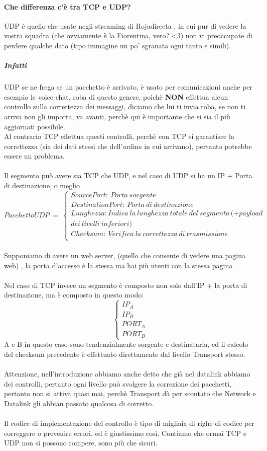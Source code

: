 \documentclass[12pt, a4paper, openany, twoside]{book}
\begin{document}
\paragraph{Che differenza c'è tra TCP e UDP?}
UDP è quello che usate negli streaming di Rojadirecta
, in cui pur di vedere la vostra squadra 
(che ovviamente è la Fiorentina, vero? <3) non vi preoccupate di perdere qualche
dato (tipo immagine un po' sgranata ogni tanto e simili).
\subparagraph{Infatti} UDP se ne frega se un pacchetto è arrivato, è usato
per comunicazioni anche per esempio le voice chat, roba di questo genere, poichè
\textbf{NON} effettua alcun controllo sulla correttezza dei messaggi, diciamo
che lui ti invia roba, se non ti arriva non gli importa, va avanti, perchè qui
è importante che si sia il più aggiornati possibile.
\\ 
Al contrario TCP effettua questi controlli, perchè con TCP si garantisce la 
correttezza (sia dei dati stessi che dell'ordine in cui arrivano), pertanto 
potrebbe essere un problema.
\\ \\
Il segmento può avere sia TCP che UDP, e nel caso di UDP si ha un IP +
Porta di destinazione, o meglio
$$Pacchetto UDP~ =~ \begin{cases}
SourcePort: ~Porta~ sorgente \\
DestinationPort: ~Porta~ di ~destinazione \\
Lunghezza: Indica~ la~ lunghezza ~totale ~del ~segmento~ (+payload~ \\dei ~livelli
~inferiori)\\
Checksum:~ Verifica ~la ~correttezza ~di ~trasmissione \\
\end{cases}$$
\\ 
Supponiamo di avere un web server, (quello che consente di vedere una pagina web)
, la porta d'accesso è la stessa ma hai più utenti con la stessa pagina
\\ \\
Nel caso di TCP invece un segmento è composto non solo dall'IP + la porta di 
destinazione, ma è composto in questo modo:
$$\begin{cases}
IP_{A} \\
IP_{B} \\
PORT_{A} \\
PORT_{B}
\end{cases}$$
A e B in questo caso sono tendenzialmente sorgente e destinataria, ed il calcolo
del checksum precedente è effettuato direttamente dal livello Transport stesso.
\\ \\
Attenzione, nell'introduzione abbiamo anche detto che già nel datalink abbiamo 
dei controlli, pertanto ogni livello può svolgere la correzione dei pacchetti,
pertanto non si attiva quasi mai, perchè Transport dà per scontato che Network
e Datalink gli abbian passato qualcosa di corretto.
\\ \\
Il codice di implementazione del controllo è tipo di migliaia di righe di codice
per correggere o prevenire errori, ed è giustissimo così. Contiamo che ormai TCP
e UDP non si possono rompere, sono più che sicuri.
\end{document}
